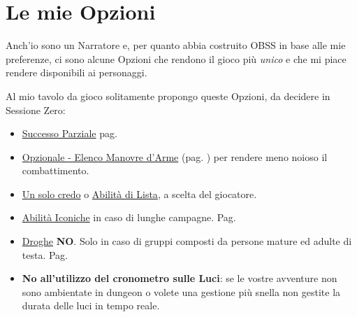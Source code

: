 \section{Le mie Opzioni}

\normalsize

Anch'io sono un Narratore e, per quanto abbia costruito OBSS in base alle mie preferenze, ci sono alcune Opzioni che rendono il gioco più \emph{unico} e che mi piace rendere disponibili ai personaggi.

Al mio tavolo da gioco solitamente propongo queste Opzioni, da decidere in Sessione Zero:

\begin{itemize}[leftmargin=*] \setlength{\itemsep}{0pt}

\item
\hyperlink{successoparziale}{Successo Parziale} pag. \pageref{successoparziale}

\item \hyperlink{elencotalentiarmi}{Opzionale - Elenco Manovre d'Arme} (pag. \pageref{elencotalentiarmi}) per rendere meno noioso il combattimento.


\item
\hyperlink{Un solo credo}{Un solo credo} o \hyperlink{abilitadilista}{Abilità di Lista}, a scelta del giocatore.

\item
\hyperlink{abilitaiconiche}{Abilità Iconiche} in caso di lunghe campagne. Pag. \pageref{abilitaiconiche}

\item
\hyperlink{droghe}{Droghe} \textbf{NO}. Solo in caso di gruppi composti da persone mature ed adulte di testa. Pag. \pageref{droghe}

\item
\textbf{No all'utilizzo del cronometro sulle Luci}: se le vostre avventure non sono ambientate in dungeon o volete una gestione più snella non gestite la durata delle luci in tempo reale.

\end{itemize}

\vfill


